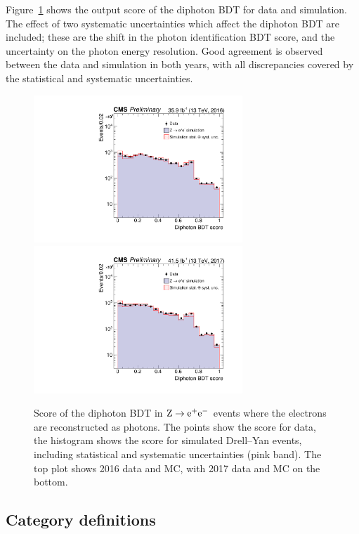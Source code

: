 Figure~\ref{fig:cat_diphoBDT} shows the output score of the diphoton BDT for data and simulation.
The effect of two systematic uncertainties which affect the diphoton BDT are included;
these are the shift in the photon identification BDT score, 
and the uncertainty on the photon energy resolution.
Good agreement is observed between the data and simulation in both years, 
with all discrepancies covered by the statistical and systematic uncertainties.

\begin{figure}[hptb]
\centering
\includegraphics[width=0.7\textwidth]{Figures/Categorisation/DiphoBDT_2016.pdf}
\includegraphics[width=0.7\textwidth]{Figures/Categorisation/DiphoBDT_2017.pdf}
\caption{
  Score of the diphoton BDT in $\mathrm{Z}\rightarrow{\mathrm{e}^{+}\mathrm{e}^{-}}$
  events where the electrons are reconstructed as photons.
  The points show the score for data, the histogram shows
  the score for simulated Drell--Yan events, including statistical and 
  systematic uncertainties (pink band).
  The top plot shows 2016 data and MC,
  with 2017 data and MC on the bottom.
}
\label{fig:cat_diphoBDT}
\end{figure}

\subsection{Category definitions}

